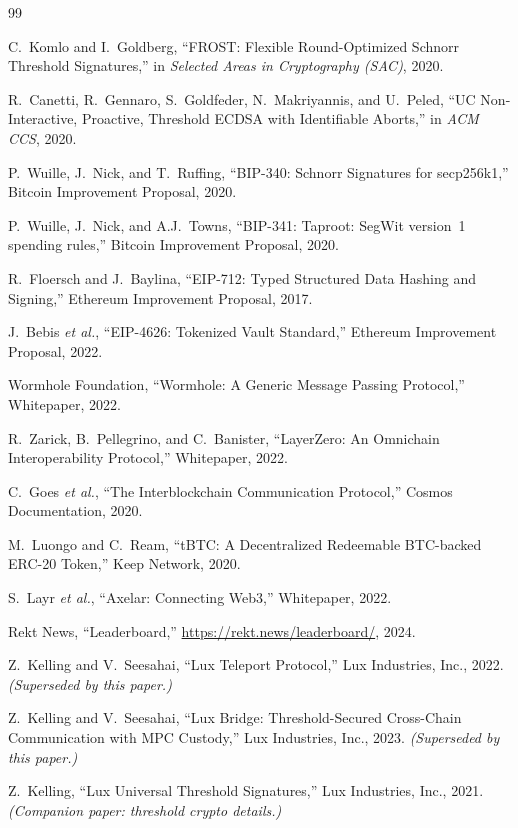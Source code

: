 \documentclass[11pt]{article}
\begin{document}
\begin{thebibliography}{99}

 C.~Komlo and I.~Goldberg, ``FROST: Flexible Round-Optimized Schnorr Threshold Signatures,'' in \emph{Selected Areas in Cryptography (SAC)}, 2020.

 R.~Canetti, R.~Gennaro, S.~Goldfeder, N.~Makriyannis, and U.~Peled, ``UC Non-Interactive, Proactive, Threshold ECDSA with Identifiable Aborts,'' in \emph{ACM CCS}, 2020.

 P.~Wuille, J.~Nick, and T.~Ruffing, ``BIP-340: Schnorr Signatures for secp256k1,'' Bitcoin Improvement Proposal, 2020.

 P.~Wuille, J.~Nick, and A.J.~Towns, ``BIP-341: Taproot: SegWit version~1 spending rules,'' Bitcoin Improvement Proposal, 2020.

 R.~Floersch and J.~Baylina, ``EIP-712: Typed Structured Data Hashing and Signing,'' Ethereum Improvement Proposal, 2017.

 J.~Bebis \emph{et al.}, ``EIP-4626: Tokenized Vault Standard,'' Ethereum Improvement Proposal, 2022.

 Wormhole Foundation, ``Wormhole: A Generic Message Passing Protocol,'' Whitepaper, 2022.

 R.~Zarick, B.~Pellegrino, and C.~Banister, ``LayerZero: An Omnichain Interoperability Protocol,'' Whitepaper, 2022.

 C.~Goes \emph{et al.}, ``The Interblockchain Communication Protocol,'' Cosmos Documentation, 2020.

 M.~Luongo and C.~Ream, ``tBTC: A Decentralized Redeemable BTC-backed ERC-20 Token,'' Keep Network, 2020.

 S.~Layr \emph{et al.}, ``Axelar: Connecting Web3,'' Whitepaper, 2022.

 Rekt News, ``Leaderboard,'' \url{https://rekt.news/leaderboard/}, 2024.

 Z.~Kelling and V.~Seesahai, ``Lux Teleport Protocol,'' Lux Industries, Inc., 2022. \emph{(Superseded by this paper.)}

 Z.~Kelling and V.~Seesahai, ``Lux Bridge: Threshold-Secured Cross-Chain Communication with MPC Custody,'' Lux Industries, Inc., 2023. \emph{(Superseded by this paper.)}

 Z.~Kelling, ``Lux Universal Threshold Signatures,'' Lux Industries, Inc., 2021. \emph{(Companion paper: threshold crypto details.)}

\end{thebibliography}
\end{document}
